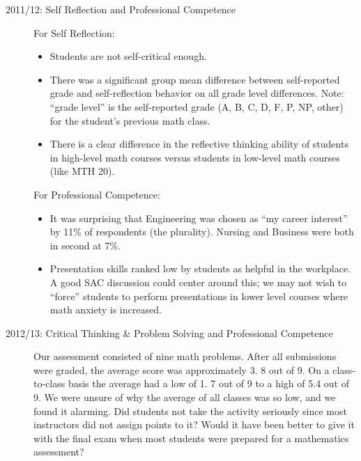 \begin{description}

	\item[2011/12: Self Reflection and Professional Competence]
	      For Self Reflection:
	      \begin{itemize}
		      \item Students are not self-critical enough.
		      \item There was a significant group mean difference between self-reported grade
		            and self-reflection behavior on all grade level differences.
		            Note: ``grade level'' is the self-reported grade (A, B, C, D, F, P, NP, other) for the student's previous math class.
		      \item There is a clear difference in the reflective thinking ability of students
		            in high-level math courses versus students in low-level math courses (like MTH
		            20).
	      \end{itemize}
	      For Professional Competence: \begin{itemize} \item It was surprising that Engineering was chosen as ``my career interest'' by 11\% of respondents (the plurality).
		            Nursing and Business were both in second at 7\%.
		      \item Presentation skills ranked low by students as helpful in the workplace.
		            A good SAC discussion could center around this; we may not wish to ``force'' students to perform presentations in lower level courses where math anxiety is increased.
	      \end{itemize}

	\item[2012/13:  Critical Thinking \& Problem Solving and Professional Competence]

	      Our assessment consisted of nine math problems.
	      After all submissions were graded, the average score was approximately 3.
	      8 out of 9.
	      On a class-to-class basis the average had a low of 1.
	      7 out of 9 to a high of 5.4 out of 9.
	      We were unsure of why the average of all classes was so low, and we found it alarming.
	      Did students not take the activity seriously since most instructors did not assign points to it?
	      Would it have been better to give it with the final exam when most students were prepared for a mathematics assessment?


\end{description}
